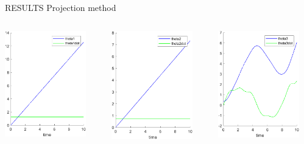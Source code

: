 \documentclass{beamer}              %
\begin{document}
	\begin{frame}{RESULTS Projection method}
		\begin{columns}
			\begin{column}{0.33\textwidth}
				\includegraphics[width=100pt]{grafici/matlabProj1.png}
			\end{column}
			\begin{column}{0.33\textwidth}
				\includegraphics[width=100pt]{grafici/matlabProj2.png}
			\end{column}
			\begin{column}{0.33\textwidth}
				\includegraphics[width=100pt]{grafici/matlabProj3.png}
			\end{column}
		\end{columns}
	\end{frame}	
\end{document}
